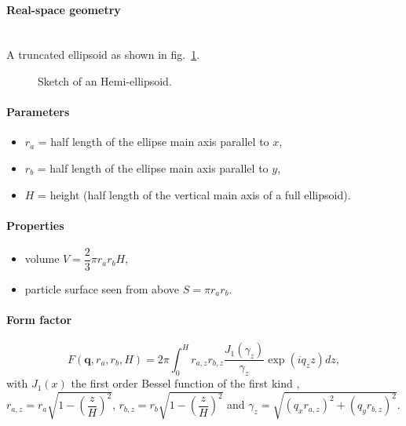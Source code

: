 \paragraph{Real-space geometry}\strut\\
A truncated ellipsoid as shown in fig.~\ref{fig:hemiellipsoid}.

\begin{figure}[ht]
\hfill
{}
\hfill
{}
\hfill
\caption{Sketch of an Hemi-ellipsoid.}
\label{fig:hemiellipsoid}
\end{figure}

\paragraph{Parameters}
\begin{itemize}
\item $r_a$ = half length of the ellipse main axis parallel to $x$,
\item$r_b$ = half length of the ellipse main axis parallel to $y$, 
\item $H$ = height (half length of the vertical main axis of a full ellipsoid).
\end{itemize}

\paragraph{Properties}
\begin{itemize}
\item volume $V = \dfrac{2}{3}\pi r_a r_bH$,
\item particle surface seen from above $S =\pi r_a r_b$.
\end{itemize}

\paragraph{Form factor}
\begin{equation*}
F(\mathbf{q},r_a,r_b,H) = 2\pi \int_0 ^{H} r_{a,z} r_{b,z}
\frac{J_1(\gamma_z)}{\gamma_z}\exp(iq_z z)dz,
\end{equation*}
with $J_1(x)$ the first order
Bessel function of the first kind \cite{AbSt64}, $r_{a,z} = r_a \sqrt{1-\left(\dfrac{z}{H} \right)^2}$, ${r_{b,z} = r_b
\sqrt{1-\left(\dfrac{z}{H} \right)^2}}$ and $\gamma_z =\sqrt{(q_x r_{a,z})^2+(q_y r_{b,z})^2}$.


